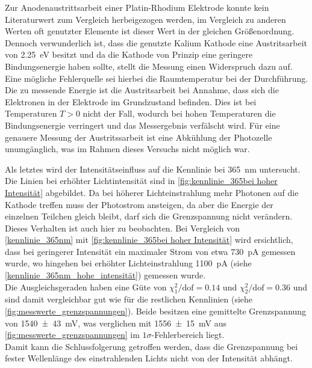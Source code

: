 Zur Anodenaustrittsarbeit einer Platin-Rhodium Elektrode
konnte kein Literaturwert zum Vergleich herbeigezogen werden, im Vergleich
zu anderen Werten oft genutzter Elemente\cite{wiki:austrittsarbeit} ist dieser Wert in der
gleichen Größenordnung. Dennoch verwunderlich ist, dass die genutzte Kalium
Kathode eine Austritsarbeit von \SI{2.25}{\electronvolt}\cite{wiki:austrittsarbeit}
besitzt und da die Kathode von Prinzip eine geringere Bindungsenergie
haben sollte, stellt die Messung einen Widerspruch dazu auf. Eine mögliche
Fehlerquelle sei hierbei die Raumtemperatur bei der Durchführung.
Die zu messende Energie ist die Austritsarbeit bei Annahme, dass sich 
die Elektronen in der Elektrode im Grundzustand befinden. Dies ist 
bei Temperaturen $T>0$ nicht der Fall, wodurch bei hohen Temperaturen
die Bindungsenergie verringert und das Messergebnis verfälscht wird. 
Für eine genauere Messung der Austritssarbeit ist eine Abkühlung 
der Photozelle unumgänglich, was im Rahmen dieses Versuchs nicht möglich war.\\\par



Als letztes wird der Intensitätseinfluss auf die Kennlinie bei \SI{365}{\nano\meter}
untersucht. Die Linien bei erhöhter Lichtintensität sind in \cref{fig:kennlinie_365bei hoher Intensität}
abgebildet. Da bei höherer Lichteinstrahlung mehr Photonen
auf die Kathode treffen muss der Photostrom ansteigen, da
aber die Energie der einzelnen Teilchen gleich bleibt, darf sich
die Grenzspannung nicht verändern.\\
Dieses Verhalten ist auch hier zu beobachten. Bei Vergleich von \cref{kennlinie_365nm} mit
\cref{fig:kennlinie_365bei hoher Intensität} wird ersichtlich, dass
bei geringerer Intensität ein maximaler Strom von etwa \SI{730}{\pico\ampere} gemessen
wurde, wo hingehen bei erhöhter Lichteinstrahlung \SI{1100}{\pico\ampere} (siehe
\cref{kennlinie_365nm_hohe_intensität})
gemessen wurde.\\

Die Ausgleichsgeraden haben eine Güte von $\chi^2_1/\mathrm{dof} = \num{0.14}$ und
$\chi^2_2/\mathrm{dof} = \num{0.36}$ und sind damit vergleichbar gut wie für die restlichen
Kennlinien (siehe \cref{fig:messwerte_grenzspannungen}). Beide besitzen eine gemittelte
Grenzspannung von \SI{1540\pm43}{\milli\volt}, was verglichen mit \SI{1556\pm 15}{\milli\volt}
aus \cref{fig:messwerte_grenzspannungen} im $1\sigma$-Fehlerbereich liegt. \\
Damit kann die Schlussfolgerung getroffen werden, dass die Grenzspannung
bei fester Wellenlänge des einstrahlenden Lichts nicht von der Intensität abhängt.
